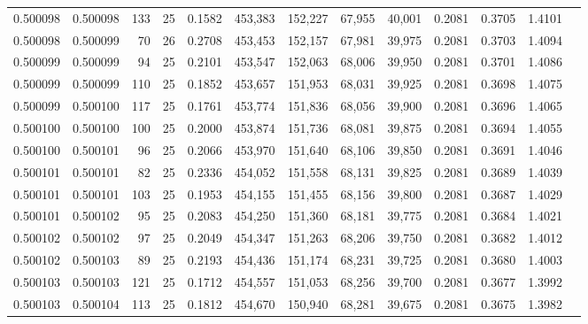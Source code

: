 \begin{tabular}{rrrrrrrrrrrrr}
0.500098 & 0.500098 & 133 &  25 &                                     0.1582 & 453,383 & 152,227 &  67,955 &  40,001 & 0.2081 & 0.3705 & 1.4101 \\
0.500098 & 0.500099 &  70 &  26 &                                     0.2708 & 453,453 & 152,157 &  67,981 &  39,975 & 0.2081 & 0.3703 & 1.4094 \\
0.500099 & 0.500099 &  94 &  25 &                                     0.2101 & 453,547 & 152,063 &  68,006 &  39,950 & 0.2081 & 0.3701 & 1.4086 \\
0.500099 & 0.500099 & 110 &  25 &                                     0.1852 & 453,657 & 151,953 &  68,031 &  39,925 & 0.2081 & 0.3698 & 1.4075 \\
0.500099 & 0.500100 & 117 &  25 &                                     0.1761 & 453,774 & 151,836 &  68,056 &  39,900 & 0.2081 & 0.3696 & 1.4065 \\
0.500100 & 0.500100 & 100 &  25 &                                     0.2000 & 453,874 & 151,736 &  68,081 &  39,875 & 0.2081 & 0.3694 & 1.4055 \\
0.500100 & 0.500101 &  96 &  25 &                                     0.2066 & 453,970 & 151,640 &  68,106 &  39,850 & 0.2081 & 0.3691 & 1.4046 \\
0.500101 & 0.500101 &  82 &  25 &                                     0.2336 & 454,052 & 151,558 &  68,131 &  39,825 & 0.2081 & 0.3689 & 1.4039 \\
0.500101 & 0.500101 & 103 &  25 &                                     0.1953 & 454,155 & 151,455 &  68,156 &  39,800 & 0.2081 & 0.3687 & 1.4029 \\
0.500101 & 0.500102 &  95 &  25 &                                     0.2083 & 454,250 & 151,360 &  68,181 &  39,775 & 0.2081 & 0.3684 & 1.4021 \\
0.500102 & 0.500102 &  97 &  25 &                                     0.2049 & 454,347 & 151,263 &  68,206 &  39,750 & 0.2081 & 0.3682 & 1.4012 \\
0.500102 & 0.500103 &  89 &  25 &                                     0.2193 & 454,436 & 151,174 &  68,231 &  39,725 & 0.2081 & 0.3680 & 1.4003 \\
0.500103 & 0.500103 & 121 &  25 &                                     0.1712 & 454,557 & 151,053 &  68,256 &  39,700 & 0.2081 & 0.3677 & 1.3992 \\
0.500103 & 0.500104 & 113 &  25 &                                     0.1812 & 454,670 & 150,940 &  68,281 &  39,675 & 0.2081 & 0.3675 & 1.3982 \\

\end{tabular}
